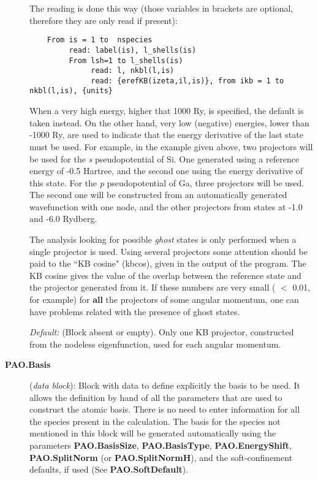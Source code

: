 \documentclass[11pt]{article}
\begin{document}
\begin{description}
The reading is done this way (those variables in brackets are optional,
therefore they are only read if
present):

\begin{verbatim}
    From is = 1 to  nspecies
         read: label(is), l_shells(is)
         From lsh=1 to l_shells(is)
              read: l, nkbl(l,is)
              read: {erefKB(izeta,il,is)}, from ikb = 1 to nkbl(l,is), {units}
\end{verbatim}

When a very high energy, higher that 1000 Ry, is specified, the
default is taken instead.  On the other hand, very low (negative)
energies, lower than -1000 Ry, are used to indicate that the energy
derivative of the last state must be used. For example, in the example
given above, two projectors will be used for the {\it s}
pseudopotential of Si. One generated using a reference energy of -0.5
Hartree, and the second one using the energy derivative of this
state. For the {\it p} pseudopotential of Ga, three projectors will be
used.  The second one will be constructed from an automatically
generated wavefunction with one node, and the other projectors from
states at -1.0 and -6.0 Rydberg.

The analysis looking for possible {\it ghost} states is only performed
when a single projector is used.  Using several projectors some
attention should be paid to the ``KB cosine" (kbcos), given in the
output of the program.  The KB cosine gives the value of the overlap
between the reference state and the projector generated from it.  If
these numbers are very small ( $<$ 0.01, for example) for {\bf all}
the projectors of some angular momentum, one can have problems related
with the presence of ghost states.

{\it Default:} (Block absent or empty). Only one KB projector,
constructed from the nodeless eigenfunction, used for each angular
momentum.
\noindent

     
\item[{\bf PAO.Basis}] ({\it data block}):  
Block with data to define explicitly the
basis to be used.  It allows the definition by hand of all the
parameters that are used to construct the atomic basis. There is no
need to enter information for all the species present in the
calculation. The basis for the species not mentioned in
this block will be generated automatically using the parameters {\bf
PAO.BasisSize}, {\bf PAO.BasisType}, {\bf PAO.EnergyShift}, {\bf
PAO.SplitNorm} (or {\bf PAO.SplitNormH}), and the soft-confinement
defaults, if used (See {\bf PAO.SoftDefault}). 


\end{description}
\end{document}
